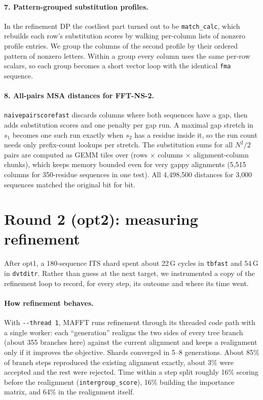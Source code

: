 \documentclass[11pt]{article}
\newcommand{\code}[1]{\texttt{#1}}
\begin{document}
\paragraph{7. Pattern-grouped substitution profiles.} In the refinement DP the costliest
part turned out to be \code{match\_calc}, which rebuilds each row's substitution scores by
walking per-column lists of nonzero profile entries. We group the columns of the second
profile by their ordered pattern of nonzero letters. Within a group every column uses the
same per-row scalars, so each group becomes a short vector loop with the identical
\code{fma} sequence.

\paragraph{8. All-pairs MSA distances for FFT-NS-2.} \code{naivepairscorefast} discards
columns where both sequences have a gap, then adds substitution scores and one penalty per
gap run. A maximal gap stretch in $s_1$ becomes one such run exactly when $s_2$ has a
residue inside it, so the run count needs only prefix-count lookups per stretch. The
substitution sums for all $N^2/2$ pairs are computed as GEMM tiles over
(rows $\times$ columns $\times$ alignment-column chunks), which keeps memory bounded even for
very gappy alignments (5{,}515 columns for 350-residue sequences in one test). All
4{,}498{,}500 distances for 3{,}000 sequences matched the original bit for bit.

\section{Round 2 (opt2): measuring refinement}
\label{sec:round2}

After opt1, a 180-sequence ITS shard spent about 22\,G cycles in \code{tbfast} and 54\,G in
\code{dvtditr}. Rather than guess at the next target, we instrumented a copy of the
refinement loop to record, for every step, its outcome and where its time went.

\paragraph{How refinement behaves.} With \code{-{}-thread 1}, MAFFT runs refinement through
its threaded code path with a single worker: each ``generation'' realigns the two sides of
every tree branch (about 355 branches here) against the current alignment and keeps a
realignment only if it improves the objective. Shards converged in 5--8 generations. About
85\% of branch steps reproduced the existing alignment exactly, about 3\% were accepted
and the rest were rejected. Time within a step split roughly 16\% scoring before the
realignment (\code{intergroup\_score}), 16\% building the importance matrix, and 64\% in the
realignment itself.
\end{document}
